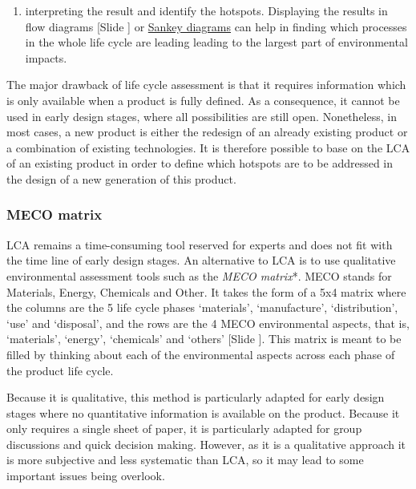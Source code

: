 \documentclass{article}
\newcounter{slide}
\begin{document}
\begin{enumerate}
	\item interpreting the result and identify the hotspots. Displaying the results in flow diagrams {\color{blue}[Slide ]} or \href{https://en.wikipedia.org/wiki/Sankey_diagram}{Sankey diagrams} can help in finding which processes in the whole life cycle are leading leading to the largest part of environmental impacts. 
\end{enumerate}

The major drawback of life cycle assessment is that it requires information which is only available when a product is fully defined. As a consequence, it cannot be used in early design stages, where all possibilities are still open. Nonetheless, in most cases, a new product is either the redesign of an already existing product or a combination of existing technologies. It is therefore possible to base on the LCA of an existing product in order to define which hotspots are to be addressed in the design of a new generation of this product. 

\subsubsection{MECO matrix}
\label{sec:streamlined}

LCA remains a time-consuming tool reserved for experts and does not fit with the time line of early design stages. An alternative to LCA is to use qualitative environmental assessment tools such as the \emph{MECO matrix}*. MECO stands for Materials, Energy, Chemicals and Other. It takes the form of a 5x4 matrix where the columns are the 5 life cycle phases `materials', `manufacture', `distribution', `use' and `disposal', and the rows are the 4 MECO environmental aspects, that is, `materials',  `energy', `chemicals' and `others' {\color{blue}[Slide ]}. This matrix is meant to be filled by thinking about each of the environmental aspects across each phase of the product life cycle.

Because it is qualitative, this method is particularly adapted for early design stages where no quantitative information is available on the product. Because it only requires a single sheet of paper, it is particularly adapted for group discussions and quick decision making. However, as it is a qualitative approach it is more subjective and less systematic than LCA, so it may lead to some important issues being overlook.
\end{document}
